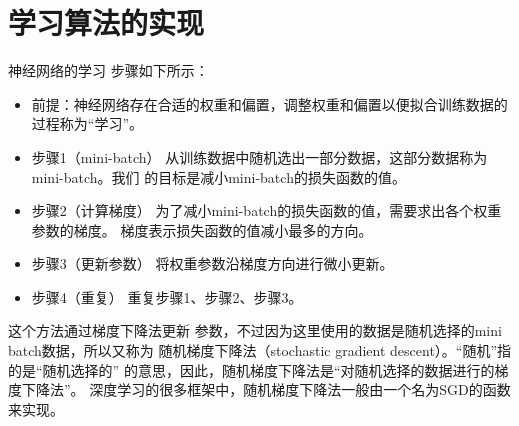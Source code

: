 \section{学习算法的实现}
神经网络的学习
步骤如下所示：
\begin{itemize}
    \item 前提：神经网络存在合适的权重和偏置，调整权重和偏置以便拟合训练数据的过程称为“学习”。
    \item 步骤1（mini-batch）
          从训练数据中随机选出一部分数据，这部分数据称为mini-batch。我们
          的目标是减小mini-batch的损失函数的值。
    \item 步骤2（计算梯度）
          为了减小mini-batch的损失函数的值，需要求出各个权重参数的梯度。
          梯度表示损失函数的值减小最多的方向。
    \item 步骤3（更新参数）
          将权重参数沿梯度方向进行微小更新。
    \item 步骤4（重复）
          重复步骤1、步骤2、步骤3。
\end{itemize}

这个方法通过梯度下降法更新
参数，不过因为这里使用的数据是随机选择的mini batch数据，所以又称为
随机梯度下降法（stochastic gradient descent）。“随机”指的是“随机选择的”
的意思，因此，随机梯度下降法是“对随机选择的数据进行的梯度下降法”。
深度学习的很多框架中，随机梯度下降法一般由一个名为SGD的函数来实现。